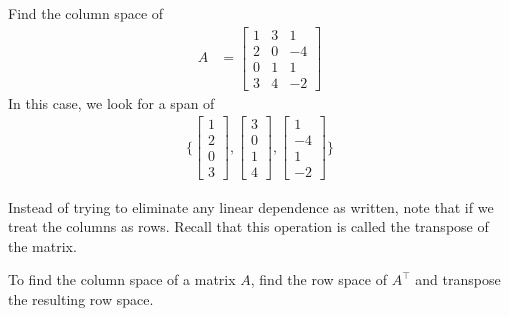 \begin{example}
Find the column space of
%
\begin{align*} A & =
\begin{bmatrix} %
1 & 3 & 1\\
2 & 0 &  -4\\
0 & 1 & 1 \\
3 & 4 & -2
\end{bmatrix}
\end{align*}
In this case, we look for a span of
%
\begin{align*}
\{ \begin{bmatrix}
1 \\ 2 \\ 0 \\ 3
\end{bmatrix}, \begin{bmatrix}
3 \\ 0 \\ 1 \\ 4
\end{bmatrix},
\begin{bmatrix}
1 \\ -4 \\ 1 \\ -2
\end{bmatrix} \}
\end{align*}

\end{example}

Instead of trying to eliminate any linear dependence as written, note that if we treat the columns as rows.  Recall that this operation is called the transpose of the matrix.

\begin{Boxed*}
To find the column space of a matrix $A$, find the row space of $A^{\intercal}$ and transpose the resulting row space.
\end{Boxed*}

